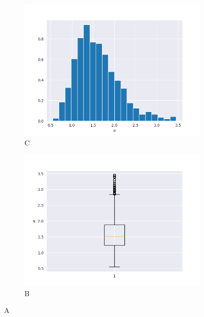 \documentclass{article}
\begin{document}
		\begin{figure}
			\begin{subfigure}{.5\textwidth}
				\centering
				\includegraphics[width=1\linewidth]{images/cdf_alpha_hist.png}
				\caption{C}
			\end{subfigure}
			\begin{subfigure}[r]{.5\textwidth}
				\centering
				\includegraphics[width=1\linewidth]{images/cdf_alpha_boxplot.png}
				\caption{B}\label{alpha1}
			\end{subfigure}
			\caption{A}
		\end{figure}
\end{document}
